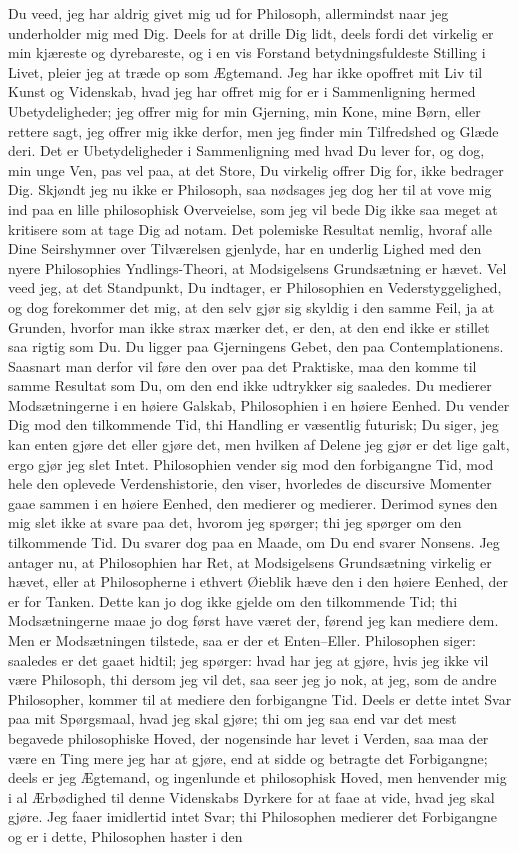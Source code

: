 \documentclass[12pt,a4paper]{article}
\begin{document}
Du veed, jeg har aldrig givet mig ud for Philosoph, allermindst naar jeg underholder mig med Dig. Deels for at drille Dig lidt, deels fordi det virkelig er min kjæreste og dyrebareste, og i en vis Forstand betydningsfuldeste Stilling i Livet, pleier jeg at træde op som Ægtemand. Jeg har ikke opoffret mit Liv til Kunst og Videnskab, hvad jeg har offret mig for er i Sammenligning hermed Ubetydeligheder; jeg offrer mig for min Gjerning, min Kone, mine Børn, eller rettere sagt, jeg offrer mig ikke derfor, men jeg finder min Tilfredshed og Glæde deri. Det er Ubetydeligheder i Sammenligning med hvad Du lever for, og dog, min unge Ven, pas vel paa, at det Store, Du virkelig offrer Dig for, ikke bedrager Dig. Skjøndt jeg nu ikke er Philosoph, saa nødsages jeg dog her til at vove mig ind paa en lille philosophisk Overveielse, som jeg vil bede Dig ikke saa meget at kritisere som at tage Dig ad notam. Det polemiske Resultat nemlig, hvoraf alle Dine Seirshymner over Tilværelsen gjenlyde, har en underlig Lighed med den nyere Philosophies Yndlings-Theori, at Modsigelsens Grundsætning er hævet. Vel veed jeg, at det Standpunkt, Du indtager, er Philosophien en Vederstyggelighed, og dog forekommer det mig, at den selv gjør sig skyldig i den samme Feil, ja at Grunden, hvorfor man ikke strax mærker det, er den, at den end ikke er stillet saa rigtig som Du. Du ligger paa Gjerningens Gebet, den paa Contemplationens. Saasnart man derfor vil føre den over paa det Praktiske, maa den komme til samme Resultat som Du, om den end ikke udtrykker sig saaledes. Du medierer Modsætningerne i en høiere Galskab, Philosophien i en høiere Eenhed. Du vender Dig mod den tilkommende Tid, thi Handling er væsentlig futurisk; Du siger, jeg kan enten gjøre det eller gjøre det, men hvilken af Delene jeg gjør er det lige galt, ergo gjør jeg slet Intet. Philosophien vender sig mod den forbigangne Tid, mod hele den oplevede Verdenshistorie, den viser, hvorledes de discursive Momenter gaae sammen i en høiere Eenhed, den medierer og medierer. Derimod synes den mig slet ikke at svare paa det, hvorom jeg spørger; thi jeg spørger om den tilkommende Tid. Du svarer dog paa en Maade, om Du end svarer Nonsens. Jeg antager nu, at Philosophien har Ret, at Modsigelsens Grundsætning virkelig er hævet, eller at Philosopherne i ethvert Øieblik hæve den i den høiere Eenhed, der er for Tanken. Dette kan jo dog ikke gjelde om den tilkommende Tid; thi Modsætningerne maae jo dog først have været der, førend jeg kan mediere dem. Men er Modsætningen tilstede, saa er der et Enten–Eller. Philosophen siger: saaledes er det gaaet hidtil; jeg spørger: hvad har jeg at gjøre, hvis jeg ikke vil være Philosoph, thi dersom jeg vil det, saa seer jeg jo nok, at jeg, som de andre Philosopher, kommer til at mediere den forbigangne Tid. Deels er dette intet Svar paa mit Spørgsmaal, hvad jeg skal gjøre; thi om jeg saa end var det mest begavede philosophiske Hoved, der nogensinde har levet i Verden, saa maa der være en Ting mere jeg har at gjøre, end at sidde og betragte det Forbigangne; deels er jeg Ægtemand, og ingenlunde et philosophisk Hoved, men henvender mig i al Ærbødighed til denne Videnskabs Dyrkere for at faae at vide, hvad jeg skal gjøre. Jeg faaer imidlertid intet Svar; thi Philosophen medierer det Forbigangne og er i dette, Philosophen haster i den 
\end{document}
